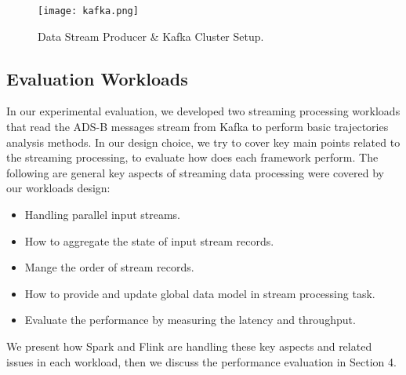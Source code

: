 \documentclass[]{article}
\begin{document}
\begin{figure}[h]
 
  \centering
    \texttt{[image: kafka.png]}
     \caption{Data Stream Producer \& Kafka Cluster Setup.}
\end{figure} 

\subsection{Evaluation Workloads}
In our experimental evaluation, we developed two streaming processing workloads that read the ADS-B messages stream from Kafka to perform basic trajectories analysis methods. In our design choice, we try to cover key main points related to the streaming processing, to evaluate how  does each framework perform. The following are general key aspects of  streaming data processing were covered by our workloads design: 

\begin{itemize}
\item Handling parallel input streams.
\item How to aggregate the state of input stream records.
\item Mange the order of stream records.
\item How to provide and update global data model in stream processing task.
\item Evaluate the performance by measuring  the latency and throughput.
\end{itemize}
We present how Spark and Flink are handling these key aspects and related issues in each workload, then we discuss the performance evaluation in Section 4.
\end{document}
